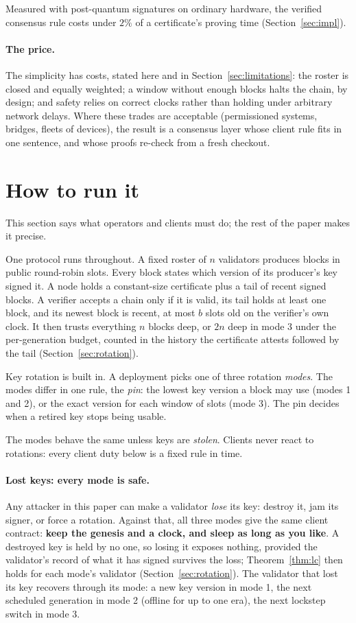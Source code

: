 \documentclass[10pt]{article}
\begin{document}
Measured with post-quantum signatures on ordinary hardware, the verified
consensus rule costs under $2\%$ of a certificate's proving time
(Section~\ref{sec:impl}).

\paragraph{The price.} The simplicity has costs, stated here and in
Section~\ref{sec:limitations}: the roster is closed and equally weighted;
a window without enough blocks halts the chain, by design; and safety
relies on correct clocks rather than holding under arbitrary network
delays. Where these trades are acceptable (permissioned systems, bridges,
fleets of devices), the result is a consensus layer whose client rule
fits in one sentence, and whose proofs re-check from a fresh checkout.

\section{How to run it}
\label{sec:opmodel}

This section says what operators and clients must do; the rest of the
paper makes it precise.

One protocol runs throughout. A fixed roster of $n$ validators produces
blocks in public round-robin slots. Every block states which version of
its producer's key signed it. A node holds a constant-size certificate
plus a tail of recent signed blocks. A verifier accepts a chain only if
it is valid, its tail holds at least one block, and its newest block is
recent, at most $b$ slots old on the verifier's own clock. It then
trusts everything $n$ blocks deep, or $2n$ deep in mode 3 under the
per-generation budget, counted in the history the certificate attests
followed by the tail (Section~\ref{sec:rotation}).

Key rotation is built in. A deployment picks one of three rotation
\emph{modes}. The modes differ in one rule, the \emph{pin}: the lowest
key version a block may use (modes 1 and 2), or the exact version for
each window of slots (mode 3). The pin decides when a retired key stops
being usable.

The modes behave the same unless keys are \emph{stolen}. Clients never
react to rotations: every client duty below is a fixed rule in time.

\paragraph{Lost keys: every mode is safe.}
Any attacker in this paper can make a validator \emph{lose} its key:
destroy it, jam its signer, or force a rotation. Against that, all three
modes give the same client contract: \textbf{keep the genesis and a
clock, and sleep as long as you like}. A destroyed key is held by no
one, so losing it exposes nothing, provided the validator's record of
what it has signed survives the loss; Theorem~\ref{thm:lc} then holds
for each mode's validator (Section~\ref{sec:rotation}). The validator that
lost its key recovers through its mode: a new key version in mode 1, the
next scheduled generation in mode 2 (offline for up to one era), the
next lockstep switch in mode 3.
\end{document}
